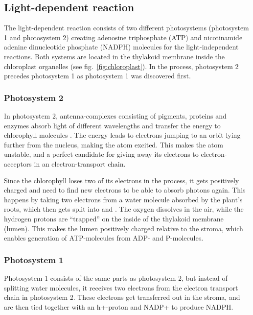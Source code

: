 \subsection{Light-dependent reaction}
The light-dependent reaction consists of two different photosystems (photosystem 1 and photosystem 2) creating adenosine triphosphate (ATP) and nicotinamide adenine dinucleotide phosphate (NADPH) molecules for the light-independent reactions. Both systems are located in the thylakoid membrane inside the chloroplast organelles (see fig.~\ref{fig:chloroplast}). In the process, photosystem 2 precedes photosystem 1 as photosystem 1 was discovered first. 

\subsubsection*{Photosystem 2}
In photosystem 2, antenna-complexes consisting of pigments, proteins and enzymes absorb light of different wavelengths and transfer the energy to chlorophyll molecules \citep{bios}. The energy leads to electrons jumping to an orbit lying further from the nucleus, making the atom excited. This makes the atom unstable, and a perfect candidate for giving away its electrons to electron-acceptors in an electron-transport chain.

Since the chlorophyll loses two of its electrons in the process, it gets positively charged and need to find new electrons to be able to absorb photons again. This happens by taking two electrons from a water molecule absorbed by the plant's roots, which then gets split into  and  \citep{bios}. The oxygen dissolves in the air, while the hydrogen protons are “trapped” on the inside of the thylakoid membrane (lumen). This makes the lumen positively charged relative to the stroma, which enables generation of ATP-molecules from ADP- and P-molecules. 

\subsubsection*{Photosystem 1}
Photosystem 1 consists of the same parts as photosystem 2, but instead of splitting water molecules, it receives two electrons from the electron transport chain in photosystem 2. These electrons get transferred out in the stroma, and are then tied together with an h+-proton and NADP+ to produce NADPH.

